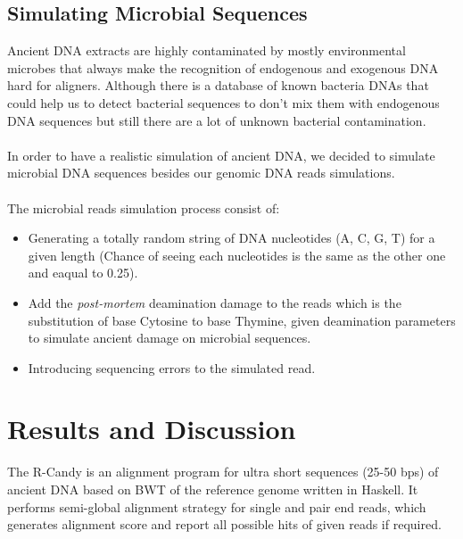 \documentclass[11pt,a4paper]{report}
\begin{document}
\subsection{Simulating Microbial Sequences}

Ancient DNA extracts are highly contaminated by mostly environmental microbes 
that always make the recognition of endogenous and exogenous DNA hard for aligners.
Although there is a database of known bacteria DNAs that could help us to detect 
bacterial sequences to don't mix them with endogenous DNA sequences but still 
there are a lot of unknown bacterial contamination.
\\\\
In order to have a realistic simulation of ancient DNA, we decided to simulate 
microbial DNA sequences besides our genomic DNA reads simulations.
\\\\
The microbial reads simulation process consist of:

\begin{itemize}

 \item Generating a totally random string of DNA nucleotides (A, C, G, T) for a 
given length (Chance of seeing each nucleotides is the same as the other one and 
eaqual to 0.25).

 \item Add the \emph{post-mortem} deamination damage to the reads which is the 
substitution of base Cytosine to base Thymine, given deamination parameters 
to simulate ancient damage on microbial sequences.


 \item Introducing sequencing errors to the simulated read.

\end{itemize}



\section{Results and Discussion}


The R-Candy is an alignment program for ultra short sequences (25-50 bps) of 
ancient DNA based on BWT of the reference genome written in Haskell. 
It performs semi-global alignment strategy for single and pair end reads, which 
generates alignment score and report all possible hits of given reads if required.
\end{document}
